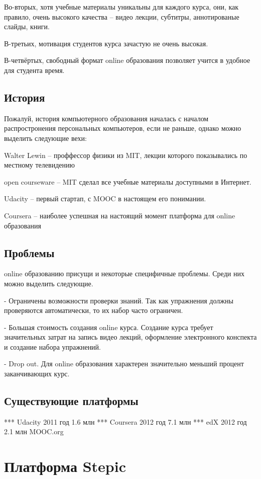 \documentclass{matmex-diploma-custom}
\begin{document}
Во-вторых, хотя учебные материалы уникальны для каждого курса, они,
как правило, очень высокого качества -- видео лекции, субтитры,
аннотированые слайды, книги.

В-третьих, мотивация студентов курса зачастую не очень высокая.

В-четвёртых, свободный формат online образования позволяет учится в
удобное для студента время.

\subsection*{История}
Пожалуй, история компьютерного образования началась с началом
распростронения персональных компьютеров, если не раньше, однако можно
выделить следующие вехи:

Walter Lewin -- проффессор физики из MIT, лекции которого показывались
по местному телевидению

open courseware -- MIT сделал все учебные материалы доступными в Интернет.

Udacity -- первый стартап, с MOOC в настоящем его понимании.

Coursera -- наиболее успешная на настоящий момент платформа для online
образования

\subsection*{Проблемы}
online образованию присущи и некоторые специфичные проблемы. Среди них
можно выделить следующие.

- Ограничены возможности проверки знаний.
  Так как упражнения должны проверяются автоматически, то их набор часто
  ограничен.

- Большая стоимость создания online курса.  Создание курса требует
  значительных затрат на запись видео лекций, оформление
  электронного конспекта и создание набора упражнений.

- Drop out. Для online образования характерен значительно меньший
  процент заканчивающих курс.

\subsection*{Существующие платформы}
*** Udacity
   2011 год
   1.6 млн
*** Coursera
   2012 год
   7.1 млн
*** edX
   2012 год
   2.1 млн
   MOOC.org

\section{Платформа Stepic}
\end{document}
